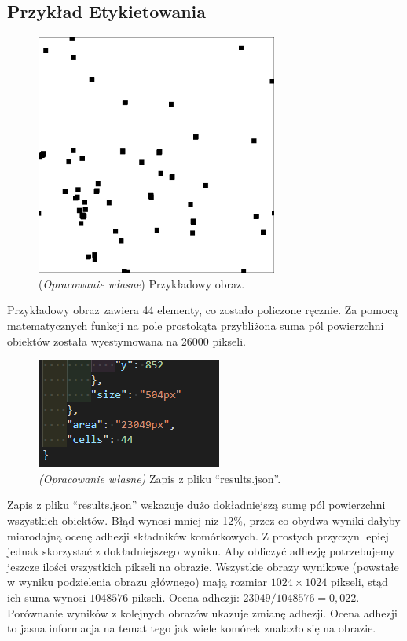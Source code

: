 \documentclass{article}
\begin{document}
    \subsection{Przykład Etykietowania}
    \begin{figure}[H]
        \centering
        \includegraphics[width=300px]{label-example.png}
        \caption
        {
            (\textit{Opracowanie własne}) Przykładowy obraz.
        }
    \end{figure}
    {
        \label{przygotowaniekataloguglownego}
        \Large
        \justifying
        \quad
        Przykładowy obraz zawiera 44 elementy, co zostało policzone ręcznie.
        Za pomocą matematycznych funkcji na pole prostokąta przybliżona suma pól powierzchni obiektów została wyestymowana na 26000 pikseli.
    }
    \begin{figure}[H]
        \centering
        \includegraphics{wynik-koniec-koniec.png}
        \caption{\textit{(Opracowanie własne)} Zapis z pliku ``results.json''.}
        \label{konieckoniec}
    \end{figure}
    {
        \label{przygotowaniekataloguglownego}
        \Large
        \justifying
        \quad
        Zapis z pliku ``results.json'' wskazuje dużo dokładniejszą sumę pól powierzchni wszystkich obiektów.
        Błąd wynosi mniej niz 12\%, przez co obydwa wyniki dałyby miarodajną ocenę adhezji składników komórkowych.
        Z prostych przyczyn lepiej jednak skorzystać z dokładniejszego wyniku.
        Aby obliczyć adhezję potrzebujemy jeszcze ilości wszystkich pikseli na obrazie.
        Wszystkie obrazy wynikowe (powstałe w wyniku podzielenia obrazu głównego) mają rozmiar $1024 \times 1024$ pikseli,
        stąd ich suma wynosi $1048576$ pikseli.
        Ocena adhezji: $23049 / 1048576 = 0,022$.
        Porównanie wyników z kolejnych obrazów ukazuje zmianę adhezji.
        Ocena adhezji to jasna informacja na temat tego jak wiele komórek znalazło się na obrazie.
    }
    \newpage
\end{document}
